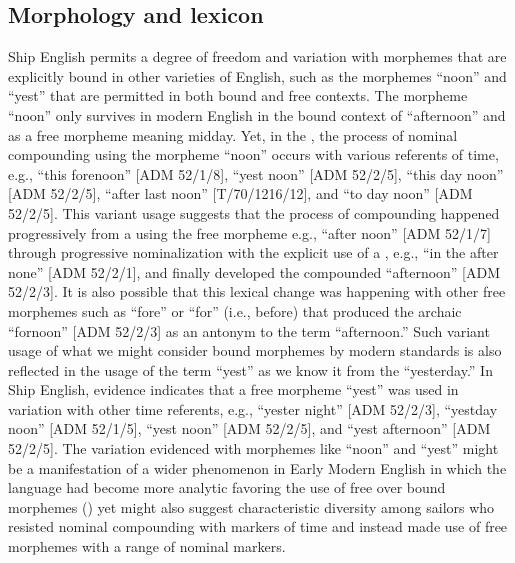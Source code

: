 \subsection{{Morphology and lexicon}}\label{sec:5.2.1}

Ship English permits a degree of freedom and variation with morphemes that are explicitly bound in other varieties of English, such as the morphemes “noon” and “yest” that are permitted in both bound and free contexts. The morpheme “noon” only survives in modern English in the bound context of “afternoon” and as a free morpheme meaning midday. Yet, in the , the process of nominal compounding using the morpheme “noon” occurs with various referents of time, e.g., “this forenoon” [ADM 52/1/8], “yest noon” [ADM 52/2/5], “this day noon” [ADM 52/2/5], “after last noon” [T/70/1216/12], and “to day noon” [ADM 52/2/5]. This variant usage suggests that the process of compounding happened progressively from a  using the free morpheme e.g., “after noon” [ADM 52/1/7] through progressive nominalization with the explicit use of a , e.g., “in the after none” [ADM 52/2/1], and finally developed the compounded  “afternoon” [ADM 52/2/3]. It is also possible that this lexical change was happening with other free morphemes such as “fore” or “for” (i.e., before) that produced the archaic  “fornoon” [ADM 52/2/3] as an antonym to the term “afternoon.” Such variant usage of what we might consider bound morphemes by modern standards is also reflected in the usage of the term “yest” as we know it from the  “yesterday.”  In Ship English, evidence indicates that a free morpheme “yest” was used in variation with other time referents, e.g., “yester night” [ADM 52/2/3], “yestday noon” [ADM 52/1/5], “yest noon” [ADM 52/2/5], and “yest afternoon” [ADM 52/2/5]. The variation evidenced with morphemes like “noon” and “yest” might be a manifestation of a wider phenomenon in Early Modern English in which the language had become more analytic favoring the use of free over bound morphemes (\citealt{MillwardHayes2012}) yet might also suggest characteristic diversity among sailors who resisted nominal compounding with markers of time and instead made use of free morphemes with a range of nominal markers.  

